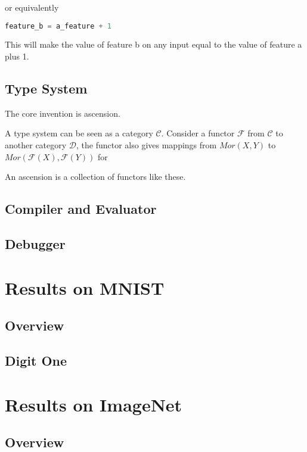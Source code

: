 \documentclass[11pt]{article} 	%
\theoremstyle{definition}
\begin{document}
or equivalently

\begin{lstlisting}[language=Python]
feature_b = a_feature + 1
\end{lstlisting}

This will make the value of feature b on any input equal to the value of feature a plus 1.

\subsection{Type System}

The core invention is ascension.

A type system can be seen as a category $\mathcal{C}$. Consider a functor $\mathcal{F}$ from $\mathcal{C}$ to another category $\mathcal{D}$,
the functor also gives mappings from $Mor(X,Y)$ to $Mor(\mathcal{F}(X), \mathcal{F}(Y))$ for 

An ascension is a collection of functors like these.

\subsection{Compiler and Evaluator}

\subsection{Debugger}


\section{Results on MNIST}

\subsection{Overview}

\subsection{Digit One}


\section{Results on ImageNet}

\subsection{Overview}
\end{document}
